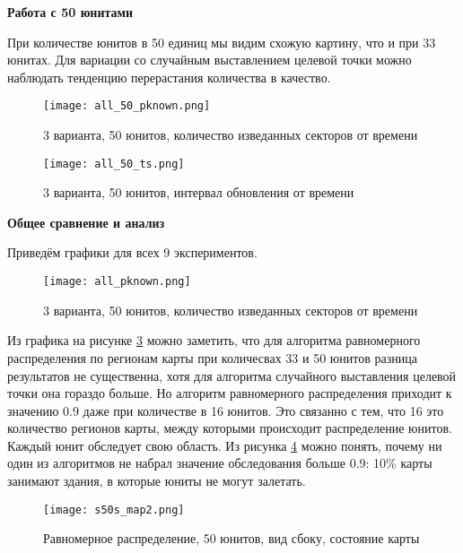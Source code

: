 \clearpage
\newpage

\textbf{Работа с 50 юнитами}

При количестве юнитов в 50 единиц мы видим схожую картину, что и при 33 юнитах.
Для вариации со случайным выставлением целевой точки можно наблюдать
тенденцию перерастания количества в качество.

\begin{figure}[h!]
    \centering
    \texttt{[image: all\_50\_pknown.png]}
    \caption{3 варианта, 50 юнитов, количество изведанных секторов от времени}
    \label{fig:all_50_pk}
\end{figure}

\begin{figure}[h!]
    \centering
    \texttt{[image: all\_50\_ts.png]}
    \caption{3 варианта, 50 юнитов, интервал обновления от времени}
    \label{fig:all_50_ts}
\end{figure}

\clearpage
\newpage

\textbf{Общее сравнение и анализ}

Приведём графики для всех 9 экспериментов.

\begin{figure}[h!]
    \centering
    \texttt{[image: all\_pknown.png]}
    \caption{3 варианта, 50 юнитов, количество изведанных секторов от времени}
    \label{fig:all_pk}
\end{figure}

Из графика на рисунке \ref{fig:all_pk} можно заметить, что для алгоритма
равномерного распределения по регионам карты при количесвах 33 и 50 юнитов
разница результатов не существенна, хотя для алгоритма случайного выставления
целевой точки она гораздо больше. Но алгоритм равномерного распределения
приходит к значению 0.9 даже при количестве в 16 юнитов. Это связанно с тем,
что 16 это количество регионов карты, между которыми происходит распределение
юнитов. Каждый юнит обследует свою область. Из рисунка \ref{fig:s50s_map2} 
можно понять, почему ни один из алгоритмов не набрал значение обследования
больше 0.9: 10\% карты занимают здания, в которые юниты не могут залетать.

\begin{figure}[h!]
    \centering
    \texttt{[image: s50s\_map2.png]}
    \caption{Равномерное распределение, 50 юнитов, вид сбоку, состояние карты}
    \label{fig:s50s_map2}
\end{figure}

